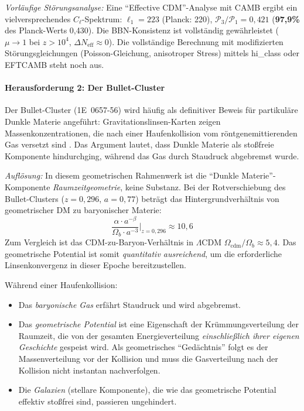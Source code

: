 \documentclass[aps,prd,twocolumn,superscriptaddress,nofootinbib]{revtex4-2}
\begin{document}
\textit{Vorl\"aufige St\"orungsanalyse:} Eine "`Effective CDM"'-Analyse mit CAMB \cite{Lewis2000} ergibt ein vielversprechendes $C_\ell$-Spektrum: $\ell_1 = 223$ (Planck: 220), $\mathcal{P}_3/\mathcal{P}_1 = 0{,}421$ (\textbf{97{,}9\%} des Planck-Werts 0{,}430). Die BBN-Konsistenz ist vollst\"andig gew\"ahrleistet ($\mu \to 1$ bei $z > 10^4$, $\Delta N_{\mathrm{eff}} \approx 0$). Die vollst\"andige Berechnung mit modifizierten St\"orungsgleichungen (Poisson-Gleichung, anisotroper Stress) mittels hi\_class \cite{Zumalacarregui2017} oder EFTCAMB \cite{Hu2014} steht noch aus.

\paragraph{Herausforderung 2: Der Bullet-Cluster}

Der Bullet-Cluster (1E~0657-56) wird h\"aufig als definitiver Beweis f\"ur partikul\"are Dunkle Materie angef\"uhrt: Gravitationslinsen-Karten zeigen Massenkonzentrationen, die nach einer Haufenkollision vom r\"ontgenemittierenden Gas versetzt sind \cite{Clowe2006}. Das Argument lautet, dass Dunkle Materie als sto\ss{}freie Komponente hindurchging, w\"ahrend das Gas durch Staudruck abgebremst wurde.

\textit{Aufl\"osung:} In diesem geometrischen Rahmenwerk ist die "`Dunkle Materie"'-Komponente \textit{Raumzeitgeometrie}, keine Substanz. Bei der Rotverschiebung des Bullet-Clusters ($z = 0{,}296$, $a = 0{,}77$) betr\"agt das Hintergrundverh\"altnis von geometrischer DM zu baryonischer Materie:
\begin{equation}
\frac{\alpha \cdot a^{-\beta}}{\Omega_b \cdot a^{-3}} \bigg|_{z=0{,}296} \approx 10{,}6
\end{equation}
Zum Vergleich ist das CDM-zu-Baryon-Verh\"altnis in $\Lambda$CDM $\Omega_{\mathrm{cdm}}/\Omega_b \approx 5{,}4$. Das geometrische Potential ist somit \textit{quantitativ ausreichend}, um die erforderliche Linsenkonvergenz in dieser Epoche bereitzustellen.

W\"ahrend einer Haufenkollision:
\begin{itemize}
\item Das \textit{baryonische Gas} erf\"ahrt Staudruck und wird abgebremst.
\item Das \textit{geometrische Potential} ist eine Eigenschaft der Kr\"ummungsverteilung der Raumzeit, die von der gesamten Energieverteilung \textit{einschlie\ss{}lich ihrer eigenen Geschichte} gespeist wird. Als geometrisches "`Ged\"achtnis"' folgt es der Massenverteilung vor der Kollision und muss die Gasverteilung nach der Kollision nicht instantan nachverfolgen.
\item Die \textit{Galaxien} (stellare Komponente), die wie das geometrische Potential effektiv sto\ss{}frei sind, passieren ungehindert.
\end{itemize}
\end{document}
